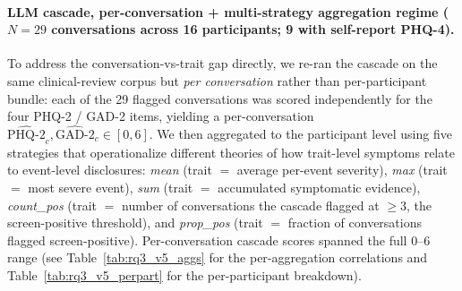 \documentclass[letterpaper]{article}
\begin{document}
\paragraph{LLM cascade, per-conversation + multi-strategy aggregation regime ($N=29$ conversations across 16 participants; 9 with self-report PHQ-4).} To address the conversation-vs-trait gap directly, we re-ran the cascade on the same clinical-review corpus but \emph{per conversation} rather than per-participant bundle: each of the 29 flagged conversations was scored independently for the four PHQ-2 / GAD-2 items, yielding a per-conversation $\widehat{\mathrm{PHQ\text{-}2}}_c, \widehat{\mathrm{GAD\text{-}2}}_c \in [0,6]$. We then aggregated to the participant level using five strategies that operationalize different theories of how trait-level symptoms relate to event-level disclosures: \emph{mean} (trait $=$ average per-event severity), \emph{max} (trait $=$ most severe event), \emph{sum} (trait $=$ accumulated symptomatic evidence), \emph{count\_pos} (trait $=$ number of conversations the cascade flagged at $\geq 3$, the screen-positive threshold), and \emph{prop\_pos} (trait $=$ fraction of conversations flagged screen-positive). Per-conversation cascade scores spanned the full 0--6 range (see Table~\ref{tab:rq3_v5_aggs} for the per-aggregation correlations and Table~\ref{tab:rq3_v5_perpart} for the per-participant breakdown).
\end{document}
